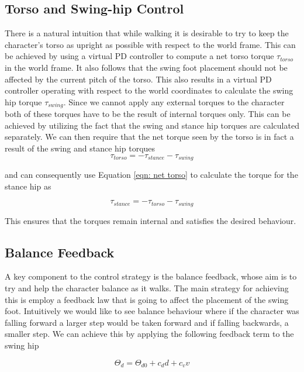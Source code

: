 \documentclass[12pt, a4paper]{article}
\begin{document}
\subsection{Torso and Swing-hip Control}
\label{subsec: torso swing hip control}
There is a natural intuition that while walking it is desirable to try to keep the character's torso as upright as possible with respect to the world frame. This can be achieved by using a virtual PD controller to compute a net torso torque $\tau_{torso}$ in the world frame. It also follows that the swing  foot placement should not be affected by the current pitch of the torso. This also results in a virtual PD controller operating with respect to the world coordinates to calculate the swing hip torque $\tau_{swing}$. Since we cannot apply any external torques to the character both of these torques have to be the result of internal torques only. This can be achieved by utilizing the fact that the swing and stance hip torques are calculated separately. We can then require that the net torque seen by the torso is in fact a result of the swing and stance hip torques
\begin{equation}
\tau_{torso} = -\tau_{stance} - \tau_{swing}
\label{eqn: net torso}
\end{equation}

and can consequently use Equation \ref{eqn: net torso} to calculate the torque for the stance hip as 

\begin{equation}
\tau_{stance} = -\tau_{torso} - \tau_{swing}
\label{eqn: stance hip torque}
\end{equation}

This ensures that the torques remain internal and satisfies the desired behaviour.

\subsection{Balance Feedback}
A key component to the control strategy is the balance feedback, whose aim is to try and help the character balance as it walks. The main strategy for achieving this is employ a feedback law that is going to affect the placement of the swing foot. Intuitively we would like to see balance behaviour where if the character was falling forward a larger step would be taken forward and if falling backwards, a smaller step. We can achieve this by applying the following feedback term to the swing hip

\begin{equation}
\Theta_d = \Theta_{d0} + c_dd+ c_vv
\label{eqn: balance feedback}
\end{equation}
\end{document}
